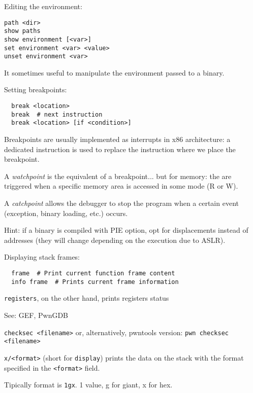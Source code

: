 Editing the environment:
\begin{verbatim}
path <dir>
show paths
show environment [<var>]
set environment <var> <value>
unset environment <var>
\end{verbatim}

It sometimes useful to manipulate the environment passed to a binary.

Setting breakpoints:
\begin{verbatim}
  break <location>
  break  # next instruction
  break <location> [if <condition>]
\end{verbatim}

Breakpoints are usually implemented as interrupts in x86 architecture: a dedicated instruction is used to replace the instruction where we place the breakpoint.

A \textit{watchpoint} is the equivalent of a breakpoint... but for memory: the are triggered when a specific memory area is accessed in some mode (R or W).

A \textit{catchpoint} allows the debugger to stop the program when a certain event (exception, binary loading, etc.) occurs.

Hint: if a binary is compiled with PIE option, opt for displacements instead of addresses (they will change depending on the execution due to ASLR).

Displaying stack frames:
\begin{verbatim}
  frame  # Print current function frame content
  info frame  # Prints current frame information
\end{verbatim}

\texttt{registers}, on the other hand, prints registers status

See: GEF, PwnGDB

\texttt{checksec <filename>} or, alternatively, pwntools version: \texttt{pwn checksec <filename>}

\texttt{x/<format>} (short for \texttt{display}) prints the data on the stack with the format specified in the \texttt{<format>} field.

Tipically format is \texttt{1gx}. 1 value, g for giant, x for hex.